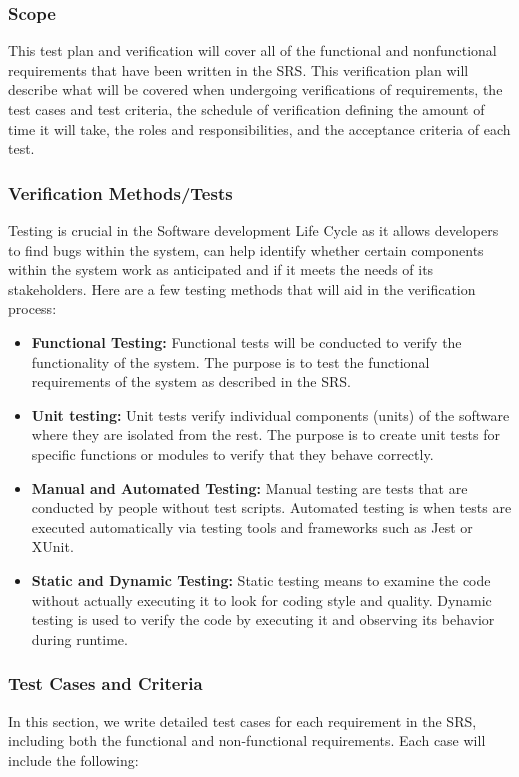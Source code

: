 \documentclass[12pt, titlepage]{article}
\begin{document}
    \subsubsection{Scope}
    This test plan and verification will cover all of the functional and nonfunctional requirements that have been written in the SRS. This verification plan will describe what will be covered when undergoing verifications of requirements, the test cases and test criteria, the schedule of verification defining the amount of time it will take, the roles and responsibilities, and the acceptance criteria of each test.

    \subsubsection{Verification Methods/Tests}
    Testing is crucial in the Software development Life Cycle as it allows developers to find bugs within the system, can help identify whether certain components within the system work as anticipated and if it meets the needs of its stakeholders. Here are a few testing methods that will aid in the verification process:

    \begin{itemize}
        \item \textbf{Functional Testing:} Functional tests will be conducted to verify the functionality of the system. The purpose is to test the functional requirements of the system as described in the SRS.
        \item \textbf{Unit testing:} Unit tests verify individual components (units) of the software where they are isolated from the rest. The purpose is to create unit tests for specific functions or modules to verify that they behave correctly.
        \item \textbf{Manual and Automated Testing:} Manual testing are tests that are conducted by people without test scripts. Automated testing is when tests are executed automatically via testing tools and frameworks such as Jest or XUnit.
        \item \textbf{Static and Dynamic Testing:} Static testing means to examine the code without actually executing it to look for coding style and quality. Dynamic testing is used to verify the code by executing it and observing its behavior during runtime.
    \end{itemize}

    \subsubsection{Test Cases and Criteria}
    In this section, we write detailed test cases for each requirement in the SRS, including both the functional and non-functional requirements. Each case will include the following:
\end{document}
